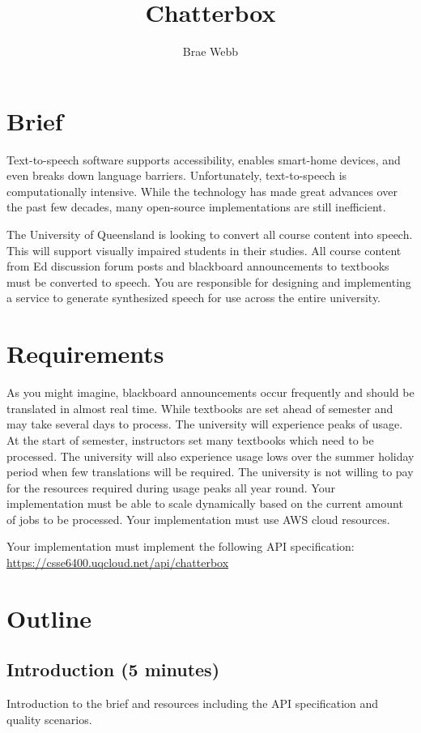 \documentclass{csse4400}
\title{Chatterbox}
\author{Brae Webb}
\date{\week[tutorial]{10}}
\begin{document}
\maketitle

\section{Brief}

Text-to-speech software supports accessibility,
enables smart-home devices,
and even breaks down language barriers.
Unfortunately, text-to-speech is computationally intensive.
While the technology has made great advances over the past few decades,
many open-source implementations are still inefficient.

The University of Queensland is looking to convert all course content into speech.
This will support visually impaired students in their studies.
All course content from Ed discussion forum posts and blackboard announcements to textbooks must be converted to speech.
You are responsible for designing and implementing a service to generate synthesized speech for use across the entire university.


\section{Requirements}

As you might imagine,
blackboard announcements occur frequently and should be translated in almost real time.
While textbooks are set ahead of semester and may take several days to process.
The university will experience peaks of usage.
At the start of semester,
instructors set many textbooks which need to be processed.
The university will also experience usage lows over the summer holiday period when few translations will be required.
The university is not willing to pay for the resources required during usage peaks all year round.
Your implementation must be able to scale dynamically based on the current amount of jobs to be processed.
Your implementation must use AWS cloud resources.

Your implementation must implement the following API specification:\\
\url{https://csse6400.uqcloud.net/api/chatterbox}


\section{Outline}

\subsection*{Introduction (5 minutes)}
Introduction to the brief
and resources including the API specification and quality scenarios.
\end{document}
